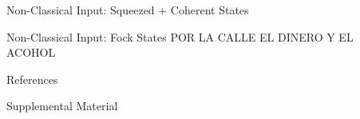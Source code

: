 \documentclass[final]{beamer}
\newlength{\sepwidth}
\newlength{\colwidth}
\newcommand{\separatorcolumn}{\begin{column}{\sepwidth}\end{column}}
\begin{document}
\begin{frame}[t]
\begin{columns}[t]
\begin{column}{\colwidth}
\begin{exampleblock}{Non-Classical Input: Squeezed + Coherent States}
  \end{exampleblock}


  \begin{exampleblock}{Non-Classical Input: Fock States}
POR LA CALLE EL DINERO Y EL ACOHOL
  \end{exampleblock}


  \begin{block}{References}

    \nocite{*}
    \footnotesize{}

  \end{block}

  \begin{block}{Supplemental Material}

    

  \end{block}

\end{column}
\separatorcolumn
\end{columns}
\end{frame}
\end{document}
